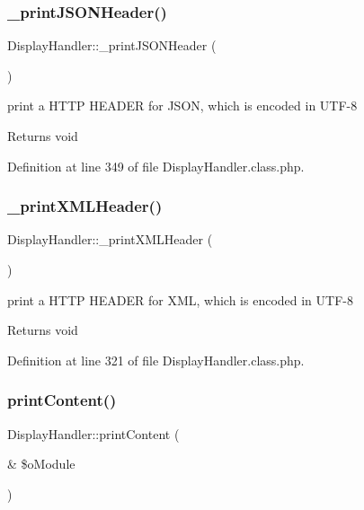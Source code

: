 \subsubsection{\texorpdfstring{\+\_\+print\+J\+S\+O\+N\+Header()}{\_printJSONHeader()}}
{\footnotesize\ttfamily Display\+Handler\+::\+\_\+print\+J\+S\+O\+N\+Header (\begin{DoxyParamCaption}{ }\end{DoxyParamCaption})}

print a H\+T\+TP H\+E\+A\+D\+ER for J\+S\+ON, which is encoded in U\+T\+F-\/8 \begin{DoxyReturn}{Returns}
void 
\end{DoxyReturn}


Definition at line 349 of file Display\+Handler.\+class.\+php.

\hypertarget{classDisplayHandler_ac1f3197b7ada7152aacf72730f34571b}{}\label{classDisplayHandler_ac1f3197b7ada7152aacf72730f34571b} 
\subsubsection{\texorpdfstring{\+\_\+print\+X\+M\+L\+Header()}{\_printXMLHeader()}}
{\footnotesize\ttfamily Display\+Handler\+::\+\_\+print\+X\+M\+L\+Header (\begin{DoxyParamCaption}{ }\end{DoxyParamCaption})}

print a H\+T\+TP H\+E\+A\+D\+ER for X\+ML, which is encoded in U\+T\+F-\/8 \begin{DoxyReturn}{Returns}
void 
\end{DoxyReturn}


Definition at line 321 of file Display\+Handler.\+class.\+php.

\hypertarget{classDisplayHandler_a40cee7b6783514fb596d4e595e5fc0f7}{}\label{classDisplayHandler_a40cee7b6783514fb596d4e595e5fc0f7} 
\subsubsection{\texorpdfstring{print\+Content()}{printContent()}}
{\footnotesize\ttfamily Display\+Handler\+::print\+Content (\begin{DoxyParamCaption}\item[{\&}]{\$o\+Module }\end{DoxyParamCaption})}

